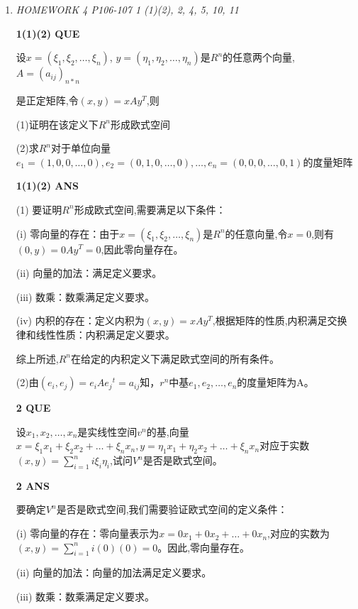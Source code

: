 \documentclass[11pt,letterpaper]{ctexart}
\begin{document}
\begin{enumerate}
\item \textit{HOMEWORK 4 {P106-107} 1 (1)(2), 2, 4, 5, 10, 11}%

\textbf{1(1)(2) QUE}
\bigskip

	设${x = (\xi_1, \xi_2, \dots, \xi_n)}$, $y = (\eta_1, \eta_2, \dots, \eta_n)$是${R^n}$的任意两个向量, $A = (a_{ij})_{n*n}$
	
	是正定矩阵,令$(x, y) = xAy^T$,则

	(1)证明在该定义下$R^n$形成欧式空间

	(2)求$R^n$对于单位向量$e_1 = (1, 0, 0, \dots, 0), e_2 = (0, 1, 0, \dots, 0), \dots, e_n = (0, 0,0, \dots, 0, 1)$的度量矩阵

\textbf{1(1)(2) ANS}
\bigskip

(1) 要证明$R^n$形成欧式空间,需要满足以下条件：

(i) 零向量的存在：由于$x = (\xi_1, \xi_2, \dots, \xi_n)$是$R^n$的任意向量,令$x = 0$,则有$(0, y) = 0Ay^T = 0$,因此零向量存在。

(ii) 向量的加法：满足定义要求。

(iii) 数乘：数乘满足定义要求。

(iv) 内积的存在：定义内积为$(x, y) = xAy^T$,根据矩阵的性质,内积满足交换律和线性性质：内积满足定义要求。

综上所述,$R^n$在给定的内积定义下满足欧式空间的所有条件。



(2)由$(e_i,e_j) = e_iA{e_j}^t = a_{ij}$知，$r^n$中基$e_1,e_2, \dots, e_n$的度量矩阵为A。


\textbf{2 QUE}
\bigskip

	设$x_1, x_2, \dots, x_n$是实线性空间$v^n$的基,向量$x = \xi_1x_1 +\xi_2x_2+\dots+\xi_nx_n, y = \eta_1x_1+ \eta_2x_2+\dots
	+\xi_nx_n$对应于实数$(x, y) = \sum_{i = 1}^ni\xi_i\eta_i$,试问$V^n$是否是欧式空间。


\textbf{2 ANS}
\bigskip

要确定$V^n$是否是欧式空间,我们需要验证欧式空间的定义条件：

(i) 零向量的存在：零向量表示为$x = 0x_1 + 0x_2 + \dots + 0x_n$,对应的实数为$(x, y) = \sum_{i=1}^ni(0)(0) = 0$。因此,零向量存在。

(ii) 向量的加法：向量的加法满足定义要求。

(iii) 数乘：数乘满足定义要求。


\end{enumerate}
\end{document}
